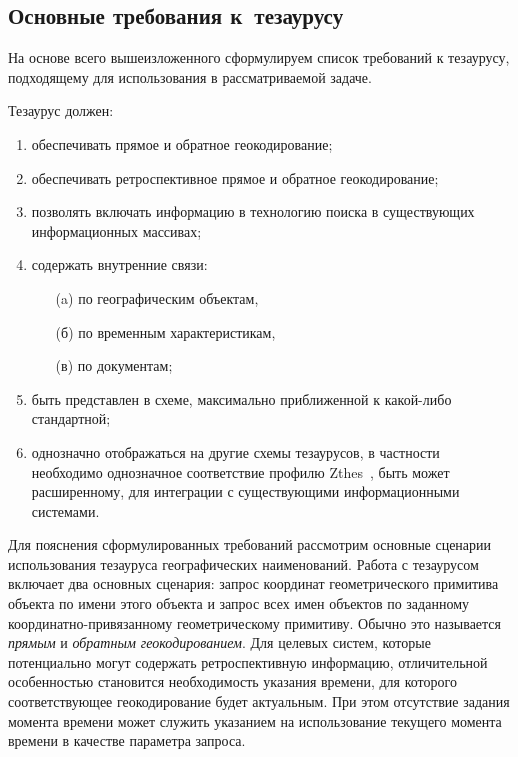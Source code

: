 \begin{multicols}{2}
  \section{Основные требования к~тезаурусу}
  
  На основе всего вышеизложенного сформулируем список требований к тезаурусу, 
подходящему для использования в рассматриваемой задаче.
  
  Тезаурус должен:
  \begin{enumerate}[(1)]
\item обеспечивать прямое и обратное геокодирование;
\item обеспечивать ретроспективное прямое и обратное геокодирование;
\item позволять включать информацию в технологию поиска в существующих 
информационных массивах;
\item содержать внутренние связи: 
\begin{itemize}
\item[(a)] по географическим объектам,
\item [(б)] по временным характеристикам,
\item[(в)] по документам;
\end{itemize}
\item быть представлен в схеме, максимально приближенной к какой-либо стандартной;
\item однозначно отображаться на другие схемы тезаурусов, в частности 
необходимо однозначное соответствие профилю {Zthes}~\cite{4-sk}, быть\linebreak 
может расширенному, для интеграции с существующими информационными 
системами.
\end{enumerate}

  Для пояснения сформулированных требований рассмотрим основные сценарии 
использования тезауруса географических наименований. Работа с тезаурусом включает два 
основных сценария: запрос координат геометрического примитива объекта по имени этого 
объекта и запрос всех имен объектов по заданному ко\-ор\-ди\-нат\-но-при\-вя\-зан\-но\-му 
гео\-мет\-ри\-че\-ско\-му примитиву. Обычно это называется \textit{прямым} и \textit{обратным 
геокодированием}. Для целевых систем, которые потенциально могут содержать 
ретроспективную информацию, отличительной особенностью становится необходимость 
указания времени, для которого соответствующее геокодирование будет актуальным. При 
этом отсутствие задания момента времени может служить указанием на использование 
текущего момента времени в качестве параметра запроса.
  

\end{multicols}
